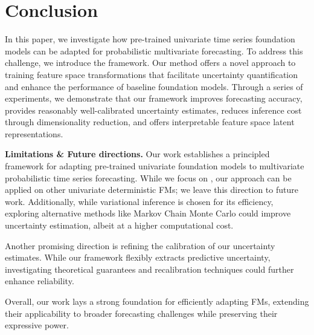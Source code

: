\section{Conclusion}
\label{sec:discussion}

In this paper, we investigate how pre-trained univariate time series foundation models can be adapted for probabilistic multivariate forecasting. To address this challenge, we introduce the \adapts framework. Our method offers a novel approach to training feature space transformations that facilitate uncertainty quantification and enhance the performance of baseline foundation models. Through a series of experiments, we demonstrate that our framework improves forecasting accuracy, provides reasonably well-calibrated uncertainty estimates, reduces inference cost through dimensionality reduction, and offers interpretable feature space latent representations.

\noindent\textbf{Limitations \& Future directions.} Our work establishes a principled framework for adapting pre-trained univariate foundation models to multivariate probabilistic time series forecasting. 
While we focus on \moment, our approach can be applied on other univariate deterministic FMs; we leave this direction to future work.
Additionally, while variational inference is chosen for its efficiency, exploring alternative methods like Markov Chain Monte Carlo could improve uncertainty estimation, albeit at a higher computational cost.

Another promising direction is refining the calibration of our uncertainty estimates. While our framework flexibly extracts predictive uncertainty, investigating theoretical guarantees and recalibration techniques could further enhance reliability.

Overall, our work lays a strong foundation for efficiently adapting FMs, extending their applicability to broader forecasting challenges while preserving their expressive power.